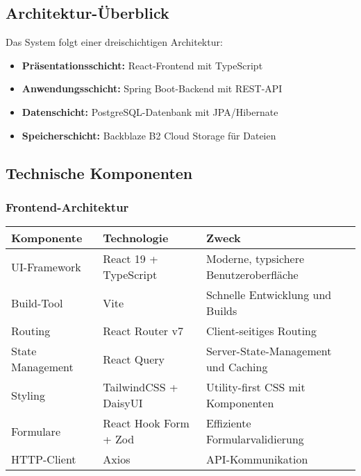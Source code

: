 \documentclass[a4paper,12pt]{article}
\begin{document}
\subsection{Architektur-Überblick}
Das System folgt einer dreischichtigen Architektur:

\begin{itemize}
    \item \textbf{Präsentationsschicht:} React-Frontend mit TypeScript
    \item \textbf{Anwendungsschicht:} Spring Boot-Backend mit REST-API
    \item \textbf{Datenschicht:} PostgreSQL-Datenbank mit JPA/Hibernate
    \item \textbf{Speicherschicht:} Backblaze B2 Cloud Storage für Dateien
\end{itemize}

\subsection{Technische Komponenten}

\subsubsection{Frontend-Architektur}
\begin{longtable}{|p{}|p{}|p{}|}
\hline
\textbf{Komponente} & \textbf{Technologie} & \textbf{Zweck} \\
\hline
UI-Framework & React 19 + TypeScript & Moderne, typsichere Benutzeroberfläche \\
\hline
Build-Tool & Vite & Schnelle Entwicklung und Builds \\
\hline
Routing & React Router v7 & Client-seitiges Routing \\
\hline
State Management & React Query & Server-State-Management und Caching \\
\hline
Styling & TailwindCSS + DaisyUI & Utility-first CSS mit Komponenten \\
\hline
Formulare & React Hook Form + Zod & Effiziente Formularvalidierung \\
\hline
HTTP-Client & Axios & API-Kommunikation \\
\hline
\end{longtable}
\end{document}
